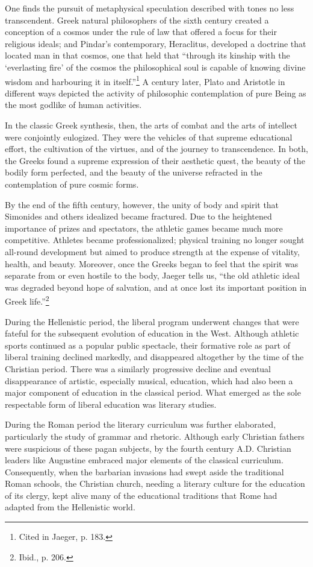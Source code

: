 One finds the pursuit of metaphysical speculation described with tones no less transcendent. Greek natural philosophers of the sixth century created a conception of a cosmos under the rule of law that offered a focus for their religious ideals; and Pindar's contemporary, Heraclitus, developed a doctrine that located man in that cosmos, one that held that ``through its kinship with the `everlasting fire' of the cosmos the philosophical soul is capable of knowing divine wisdom and harbouring it in itself.''\footnote{Cited in Jaeger, p. 183.} A century later, Plato and Aristotle in different ways depicted the activity of philosophic contemplation of pure Being as the most godlike of human activities. 

In the classic Greek synthesis, then, the arts of combat and the arts of intellect were conjointly eulogized. They were the vehicles of that supreme educational effort, the cultivation of the virtues, and of the journey to transcendence. In both, the Greeks found a supreme expression of their aesthetic quest, the beauty of the bodily form perfected, and the beauty of the universe refracted in the contemplation of pure cosmic forms. 

By the end of the fifth century, however, the unity of body and spirit that Simonides and others idealized became fractured. Due to the heightened importance of prizes and spectators, the athletic games became much more competitive. Athletes became professionalized; physical training no longer sought all-round development but aimed to produce strength at the expense of vitality, health, and beauty. Moreover, once the Greeks began to feel that the spirit was separate from or even hostile to the body, Jaeger tells us, ``the old athletic ideal was degraded beyond hope of salvation, and at once lost its important position in Greek life.''\footnote{Ibid., p. 206.}

During the Hellenistic period, the liberal program underwent changes that were fateful for the subsequent evolution of education in the West. Although athletic sports continued as a popular public spectacle, their formative role as part of liberal training declined markedly, and disappeared altogether by the time of the Christian period. There was a similarly progressive decline and eventual disappearance of artistic, especially musical, education, which had also been a major component of education in the classical period. What emerged as the sole respectable form of liberal education was literary studies. 

During the Roman period the literary curriculum was further elaborated, particularly the study of grammar and rhetoric. Although early Christian fathers were suspicious of these pagan subjects, by the fourth century A.D. Christian leaders like Augustine embraced major elements of the classical curriculum. Consequently, when the barbarian invasions had swept aside the traditional Roman schools, the Christian church, needing a literary culture for the education of its clergy, kept alive many of the educational traditions that Rome had adapted from the Hellenistic world. 

